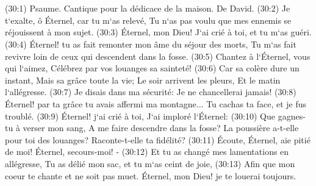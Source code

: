 \chapter{}

\verse (30:1) Psaume. Cantique pour la dédicace de la maison. De David. (30:2) Je t`exalte, ô Éternel, car tu m`as relevé, Tu n`as pas voulu que mes ennemis se réjouissent à mon sujet. 
\verse (30:3) Éternel, mon Dieu! J`ai crié à toi, et tu m`as guéri. 
\verse (30:4) Éternel! tu as fait remonter mon âme du séjour des morts, Tu m`as fait revivre loin de ceux qui descendent dans la fosse. 
\verse (30:5) Chantez à l`Éternel, vous qui l`aimez, Célébrez par vos louanges sa sainteté! 
\verse (30:6) Car sa colère dure un instant, Mais sa grâce toute la vie; Le soir arrivent les pleurs, Et le matin l`allégresse. 
\verse (30:7) Je disais dans ma sécurité: Je ne chancellerai jamais! 
\verse (30:8) Éternel! par ta grâce tu avais affermi ma montagne... Tu cachas ta face, et je fus troublé. 
\verse (30:9) Éternel! j`ai crié à toi, J`ai imploré l`Éternel: 
\verse (30:10) Que gagnes-tu à verser mon sang, A me faire descendre dans la fosse? La poussière a-t-elle pour toi des louanges? Raconte-t-elle ta fidélité? 
\verse (30:11) Écoute, Éternel, aie pitié de moi! Éternel, secours-moi! - 
\verse (30:12) Et tu as changé mes lamentations en allégresse, Tu as délié mon sac, et tu m`as ceint de joie, 
\verse (30:13) Afin que mon coeur te chante et ne soit pas muet. Éternel, mon Dieu! je te louerai toujours. 

\chapter{}

